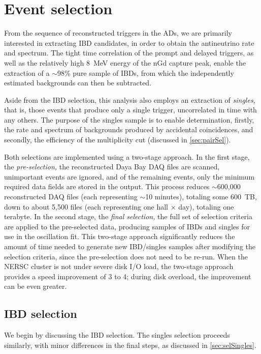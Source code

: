 \documentclass[../thesis.tex]{subfiles}
\begin{document}
\chapter{Event selection}
\label{chap:selection}

From the sequence of reconstructed triggers in the ADs, we are primarily interested in extracting IBD candidates, in order to obtain the antineutrino rate and spectrum. The tight time correlation of the prompt and delayed triggers, as well as the relatively high 8~MeV energy of the nGd capture peak, enable the extraction of a $\sim$98\% pure sample of IBDs, from which the independently estimated backgrounds can then be subtracted.

Aside from the IBD selection, this analysis also employs an extraction of \emph{singles,} that is, those events that produce only a single trigger, uncorrelated in time with any others. The purpose of the singles sample is to enable determination, firstly, the rate and spectrum of backgrounds produced by accidental coincidences, and secondly, the efficiency of the multiplicity cut (discussed in \autoref{sec:pairSel}).

Both selections are implemented using a two-stage approach. In the first stage, the \emph{pre-selection,} the reconstructed Daya Bay DAQ files are scanned, unimportant events are ignored, and of the remaining events, only the minimum required data fields are stored in the output. This process reduces $\sim$600,000 reconstructed DAQ files (each representing $\sim$10 minutes), totaling some 600~TB, down to about 5,500 files (each representing one hall $\times$ day), totaling one terabyte. In the second stage, the \emph{final selection,} the full set of selection criteria are applied to the pre-selected data, producing samples of IBDs and singles for use in the oscillation fit. This two-stage approach significantly reduces the amount of time needed to generate new IBD/singles samples after modifying the selection criteria, since the pre-selection does not need to be re-run. When the NERSC cluster is not under severe disk I/O load, the two-stage approach provides a speed improvement of 3 to 4; during disk overload, the improvement can be even greater.

\section{IBD selection}
\label{sec:selIBDs}

We begin by discussing the IBD selection. The singles selection proceeds similarly, with minor differences in the final steps, as discussed in \autoref{sec:selSingles}.
\end{document}
